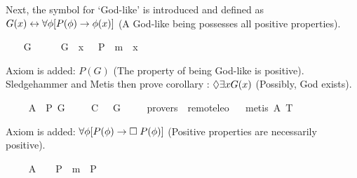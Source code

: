 \begin{isabellebody}
\begin{isamarkuptext}
Next, the symbol  for `God-like'  is introduced and defined 
as $G(x) \leftrightarrow \forall \phi [P(\phi) \to \phi(x)]$ (A God-like being possesses 
all positive properties).%
\end{isamarkuptext}%
\isamarkuptrue%
\ \ \isamarkupfalse%
\ G\ {\isacharcolon}{\isacharcolon}\ {\isachardoublequoteopen}{\isasymmu}\ {\isasymRightarrow}\ {\isasymsigma}{\isachardoublequoteclose}\ \ {\isachardoublequoteopen}G\ {\isacharequal}\ {\isacharparenleft}{\isasymlambda}x{\isachardot}\ {\isasymPi}\ {\isacharparenleft}{\isasymlambda}{\isasymPhi}{\isachardot}\ P\ {\isasymPhi}\ m{\isasymRightarrow}\ {\isasymPhi}\ x{\isacharparenright}{\isacharparenright}{\isachardoublequoteclose}%
\begin{isamarkuptext}%
Axiom  is added: $P(G)$ (The property of being God-like is positive).
Sledgehammer and Metis then prove corollary : $\Diamond \exists x G(x)$ 
(Possibly, God exists).%
\end{isamarkuptext}%
\isamarkuptrue%
\ \ \isamarkupfalse%
\ \ A{}{\isacharcolon}\ \ {\isachardoublequoteopen}{\isacharbrackleft}P\ G{\isacharbrackright}{\isachardoublequoteclose}\ \isanewline
\isanewline
\ \ \isamarkupfalse%
\ C{\isacharcolon}\ {\isachardoublequoteopen}{\isacharbrackleft}{\isasymdiamond}\ {\isacharparenleft}{\isasymexists}\ G{\isacharparenright}{\isacharbrackright}{\isachardoublequoteclose}\ \isanewline
\ \ \isamarkupfalse%
\ {\isacharbrackleft}provers\ {\isacharequal}\ remote{\isacharunderscore}leo{}{\isacharbrackright}%
\isadelimproof
\ %
\endisadelimproof
%
\isatagproof
{}\isamarkupfalse%
\ {\isacharparenleft}metis\ A{}\ T{}{\isacharparenright}%
\endisatagproof
{\isafoldproof}%
%
\isadelimproof
%
\endisadelimproof
%
\begin{isamarkuptext}%
Axiom  is added: $\forall \phi [P(\phi) \to \Box \; P(\phi)]$ 
(Positive properties are necessarily positive).%
\end{isamarkuptext}%
\isamarkuptrue%
\ \ \isamarkupfalse%
\ \ A{}{\isacharcolon}\ \ {\isachardoublequoteopen}{\isacharbrackleft}{\isasymPi}\ {\isacharparenleft}{\isasymlambda}{\isasymPhi}{\isachardot}\ P\ {\isasymPhi}\ m{\isasymRightarrow}\ {\isasymbox}\ {\isacharparenleft}P\ {\isasymPhi}{\isacharparenright}{\isacharparenright}{\isacharbrackright}{\isachardoublequoteclose}%

\end{isabellebody}

